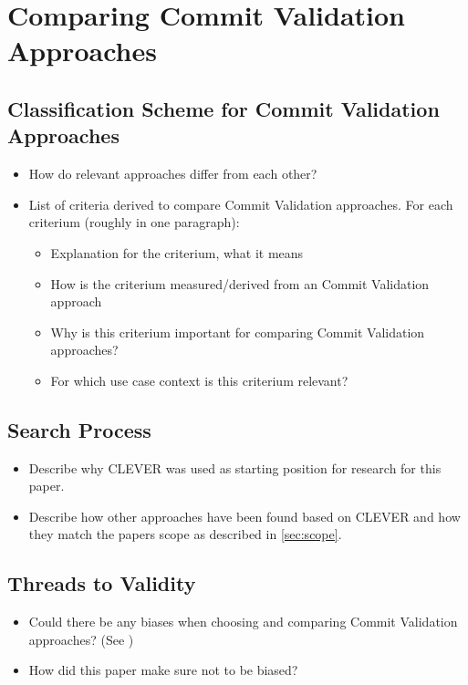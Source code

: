 

\section{Comparing Commit Validation Approaches}

\subsection{Classification Scheme for Commit Validation Approaches}
\label{sec:scheme}
\begin{itemize}
	\item How do relevant approaches differ from each other?
	\item List of criteria derived to compare Commit Validation approaches. For each criterium (roughly in one paragraph):
	\begin{itemize}
		\item Explanation for the criterium, what it means
		\item How is the criterium measured/derived from an Commit Validation approach
		\item Why is this criterium important for comparing Commit Validation approaches?
		\item For which use case context is this criterium relevant?
	\end{itemize}
	
\end{itemize}

\subsection{Search Process}
\begin{itemize}
	\item Describe why CLEVER was used as starting position for research for this paper. \cite{Nayrolles2018}
	\item Describe how other approaches have been found based on CLEVER and how they match the papers scope as described in \ref{sec:scope}.
\end{itemize}

\subsection{Threads to Validity}
\begin{itemize}
	\item Could there be any biases when choosing and comparing Commit Validation approaches? (See \cite{Kitchenham2004})
	\item How did this paper make sure not to be biased?
\end{itemize}


